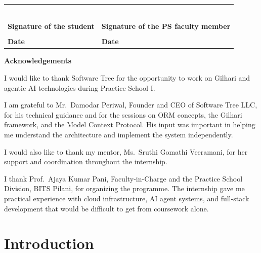 \documentclass{book}
\begin{document}
\begin{tabular}{p{4.5cm} p{10.5cm}}
			& \\
			& \\
			& \\
			& \\
			& \\
			& \\
			\textbf{Signature of the student} & \hspace*{2cm}\textbf{Signature of the PS faculty member} \\
			& \\
			\textbf{Date} & \hspace*{2cm}\textbf{Date} \\
		\end{tabular}

	\newpage
	\centerline{\bf \Large Acknowledgements}
	\vspace*{0.5cm}

		\par\noindent I would like to thank Software Tree for the opportunity to work on Gilhari and agentic AI technologies during Practice School I.

		\par\noindent I am grateful to Mr.\ Damodar Periwal, Founder and CEO of Software Tree LLC, for his technical guidance and for the sessions on ORM concepts, the Gilhari framework, and the Model Context Protocol. His input was important in helping me understand the architecture and implement the system independently.

		\par\noindent I would also like to thank my mentor, Ms.\ Sruthi Gomathi Veeramani, for her support and coordination throughout the internship.

		\par\noindent I thank Prof.\ Ajaya Kumar Pani, Faculty-in-Charge and the Practice School Division, BITS Pilani, for organizing the programme. The internship gave me practical experience with cloud infrastructure, AI agent systems, and full-stack development that would be difficult to get from coursework alone.

		\vfill

		\par{}

\tableofcontents
\listoffigures
\listoftables

\chapter{Introduction}
\end{document}
